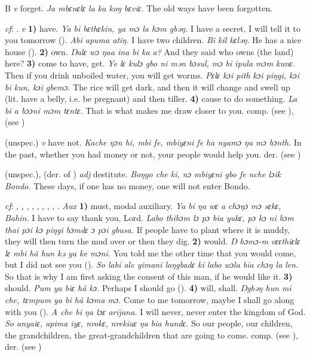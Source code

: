 \begin{letter}{B}
 \textit{v} forget. \textit{Ja mbɛnɛlɛ la ka koŋ bɛviɛ.} The old ways have been forgotten. 

 \textit{cf}: . \textit{v} \textbf{1)} have. \textit{Ya bi bɛthɛkin, ya mɔ la hɔm gbəŋ.} I have a secret, I will tell it to you tomorrow (\citealt{Pichl1967}). \textit{Abi apuma atiŋ.} I have two children. \textit{Bi kil kɛləŋ.} He has a nice house (\citealt{Pichl1967}). \textbf{2)} own. \textit{Ŋalɛ wɔ ŋaa ina bi ka a?} And they said who owns (the land) here? \textbf{3)} come to have, get. \textit{Ye lɛ kulɔ gbo ni mən bɔsul, mɔ bi ipula mɔm kunɛ.} Then if you drink unboiled water, you will get worms. \textit{Pɛlɛ kɔi pith kɔi piŋgi, kɔi bi kun, kɔi gbemɔ.} The rice will get dark, and then it will change and swell up (lit. have a belly, i.e. be pregnant) and then tiller. \textbf{4)} cause to do something. \textit{La bi a bɔɔni mɔm tɛntɛ.} That is what makes me draw closer to you. comp.  (see ),  (see ) 

 (unspec.) \textit{v} have not. \textit{Kache ŋɔn hi, mbi fe, mbiyɛni fe ha nyamɔ ŋa mɔ bɔnth.} In the past, whether you had money or not, your people would help you. der.  (see )

 (unspec.), (der. of ) \textit{adj} destitute. \textit{Boŋgo che ki, nɔ mbiyɛni gbo fe nche lɔik Bondo.} These days, if one has no money, one will not enter Bondo.

 \textit{cf}: , , , , , , , , . \textit{Aux} \textbf{1)} must, modal auxiliary. \textit{Ya bi ŋa wɛ a chɔŋɔ mɔ sɛkɛ, Bahin.} I have to say thank you, Lord. \textit{Labo thibɔm lɔ pɔ bia yukɛ, pɔ kɔ ni bɔm thai pɔi kɔ piŋgi bɔmdɛ ɔ pɔi gbusa.} If people have to plant where it is muddy, they will then turn the mud over or then they dig. \textbf{2)} would. \textit{Ŋ hɔmɔ-m vɛɛthiɛlɛ lɛ mbi hã hun kə ya ke mɔni.} You told me the other time that you would come, but I did not see you (\citealt{Pichl1967}). \textit{So labi ale yimani laŋgbadɛ ki labo wɔla bia chɔŋ la len.} So that is why I am first asking the consent of this man, if he would like it. \textbf{3)} should. \textit{Pum ya biɛ hã kɔ.} Perhaps I should go (\citealt{Pichl1967}). \textbf{4)} will, shall. \textit{ Ŋgbəŋ hun mi che, tɛmpum ya bi hã kɔma mɔ.} Come to me tomorrow, maybe I shall go along with you (\citealt{Pichl1967}). \textit{A che bi ŋa lɔɛ arijana.} I will never, never enter the kingdom of God. \textit{So anyaiɛ, apima iyɛ, nrokɛ, nrekiaɛ ŋa bia hundɛ.} So our people, our children, the grandchildren, the great-grandchildren that are going to come. comp.  (see ), der.  (see ) 


\end{letter}
